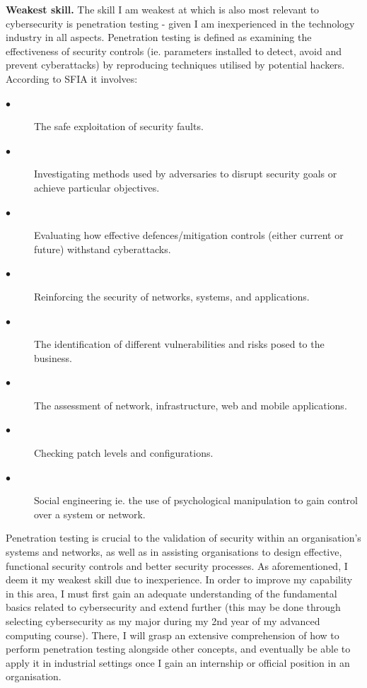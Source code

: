 \documentclass[a4paper, 11pt]{report}
\begin{document}
\textbf{Weakest skill.}
\newline The skill I am weakest at which is also most relevant to cybersecurity is penetration testing - given I am inexperienced in the technology industry in all aspects. Penetration testing is defined as examining the effectiveness of security controls (ie. parameters installed to detect, avoid and prevent cyberattacks) by reproducing techniques utilised by potential hackers. According to SFIA \cite{sfia} it involves:
\begin{description}
\item[$\bullet$]  The safe exploitation of security faults.
\item[$\bullet$]  Investigating methods used by adversaries to disrupt security goals or achieve particular objectives.
\item[$\bullet$]  Evaluating how effective defences/mitigation controls (either current or future) withstand cyberattacks. 
\item[$\bullet$]  Reinforcing the security of networks, systems, and applications.
\item[$\bullet$]  The identification of different vulnerabilities and risks posed to the business.
\item[$\bullet$]  The assessment of network, infrastructure, web and mobile applications.
\item[$\bullet$]  Checking patch levels and configurations.
\item[$\bullet$]  Social engineering ie. the use of psychological manipulation to gain control over a system or network.
\end{description}

Penetration testing is crucial to the validation of security within an organisation’s systems and networks, as well as in assisting organisations to design effective, functional security controls and better security processes.  As aforementioned, I deem it my weakest skill due to inexperience. In order to improve my capability in this area, I must first gain an adequate understanding of the fundamental basics related to cybersecurity and extend further (this may be done through selecting cybersecurity as my major during my 2nd year of my advanced computing course). There, I will grasp an extensive comprehension of how to perform penetration testing alongside other concepts, and eventually be able to apply it in industrial settings once I gain an internship or official position in an organisation. 
\end{document}
